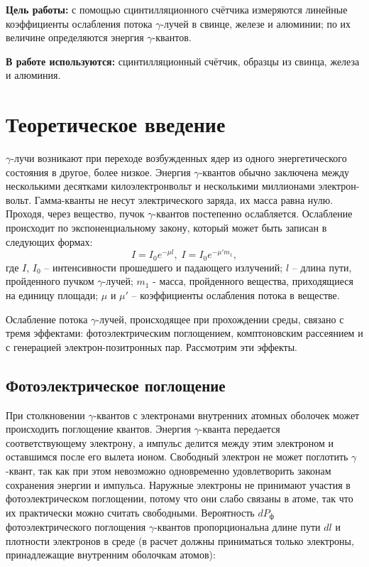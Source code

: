 \textbf{Цель работы:} с помощью сцинтилляционного счётчика измеряются линейные коэффициенты ослабления потока $\gamma$-лучей в свинце, железе и алюминии; 
по их величине определяются энергия $\gamma$-квантов.

\textbf{В работе используются:} сцинтилляционный счётчик, образцы из свинца, железа и алюминия.
                    
\section{Теоретическое введение}

    $\gamma$-лучи возникают при переходе возбужденных ядер из одного энергетического состояния в другое, более низкое. Энергия $\gamma$-квантов обычно заключена между несколькими десятками килоэлектронвольт и несколькими миллионами электрон-вольт. Гамма-кванты не несут электрического заряда, их масса равна нулю. Проходя, через вещество, пучок $\gamma$-квантов постепенно ослабляется. Ослабление происходит по экспоненциальному закону, который может быть записан в следующих формах:
    \begin{equation}
        \label{I(mu)}
        I = I_0 e^{-\mu l}, \; I = I_0 e^{-\mu' m_1},
    \end{equation}
    где $I$, $I_0$ -- интенсивности прошедшего и падающего излучений; $l$ -- длина пути, пройденного пучком $\gamma$-лучей; $m_1$ - масса, пройденного вещества, приходящиеся на единицу площади; $\mu$ и $\mu'$ -- коэффициенты ослабления потока в веществе.

    Ослабление потока $\gamma$-лучей, происходящее при прохождении среды, связано с тремя эффектами: фотоэлектрическим поглощением, комптоновским рассеянием и с генерацией электрон-позитронных пар. Рассмотрим эти эффекты.

\subsection*{Фотоэлектрическое поглощение}

    При столкновении $\gamma$-квантов с электронами внутренних атомных оболочек может происходить поглощение квантов. Энергия $\gamma$-кванта передается соответствующему электрону, а импульс делится между этим электроном и оставшимся после его вылета ионом. Свободный электрон не может поглотить $\gamma$-квант, так как при этом невозможно одновременно удовлетворить законам сохранения энергии и импульса. Наружные электроны не принимают участия в фотоэлектрическом поглощении, потому что они слабо связаны в атоме, так что их практически можно считать свободными. Вероятность $dP_{\text{ф}}$ фотоэлектрического поглощения $\gamma$-квантов пропорциональна длине пути $dl$ и плотности электронов в среде (в расчет должны приниматься только электроны, принадлежащие внутренним оболочкам атомов):
	
